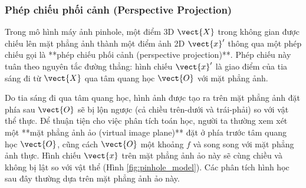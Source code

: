 \subsubsection{Phép chiếu phối cảnh (Perspective Projection)}

Trong mô hình máy ảnh pinhole, một điểm 3D $\vect{X}$ trong không gian được chiếu lên mặt phẳng ảnh thành một điểm ảnh 2D $\vect{x}'$ thông qua một phép chiếu gọi là **phép chiếu phối cảnh (perspective projection)**. Phép chiếu này tuân theo nguyên tắc đường thẳng: hình chiếu $\vect{x}'$ là giao điểm của tia sáng đi từ $\vect{X}$ qua tâm quang học $\vect{O}$ với mặt phẳng ảnh.

Do tia sáng đi qua tâm quang học, hình ảnh được tạo ra trên mặt phẳng ảnh đặt phía sau $\vect{O}$ sẽ bị lộn ngược (cả chiều trên-dưới và trái-phải) so với vật thể thực. Để thuận tiện cho việc phân tích toán học, người ta thường xem xét một **mặt phẳng ảnh ảo (virtual image plane)** đặt ở phía trước tâm quang học $\vect{O}$, cũng cách $\vect{O}$ một khoảng $f$ và song song với mặt phẳng ảnh thực. Hình chiếu $\vect{x}$ trên mặt phẳng ảnh ảo này sẽ cùng chiều và không bị lật so với vật thể (Hình \ref{fig:pinhole_model}). Các phân tích hình học sau đây thường dựa trên mặt phẳng ảnh ảo này.

